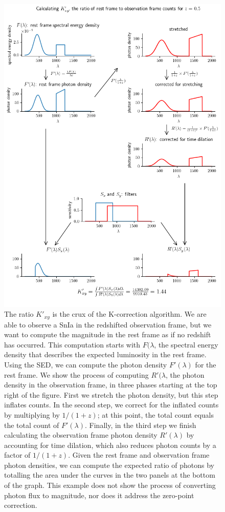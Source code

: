 \documentclass[linenumbers]{aastex631}
\begin{document}
\begin{figure}
  \includegraphics[width=.75\linewidth, height=0.75\vsize]{k_equation_flow.png}
  \caption{The ratio $K'_{xy}$ is the crux of the K-correction algorithm. We
  are able to observe a SnIa in the redshifted observation frame, but we want
  to compute the magnitude in the rest frame as if no redshift has occurred.
  This computation starts with $F(\lambda$, the spectral energy density that
  describes the expected luminosity in the rest frame. Using the SED, we can
  compute the photon density $F'(\lambda)$ for the rest frame. We show the
  process of computing $R'(\lambda$, the photon density in the observation
  frame, in three phases starting at the top right of the figure. First we
  stretch the photon density, but this step inflates counts. In the second
  step, we correct for the inflated counts by multiplying by $1/(1+z)$;
  at this point, the total count equals the total count of $F'(\lambda)$.
  Finally, in the third step we finish calculating the observation frame photon
  density $R'(\lambda)$ by accounting for time dilation, which also reduces
  photon counts by a factor of $1/(1+z)$.  Given the rest frame and
  observation frame photon densities, we can compute the expected ratio of
  photons by totalling the area under the curves in the two panels at the
  bottom of the graph. This example does not show the process of converting
  photon flux to magnitude, nor does it address the zero-point correction.
  }
  \label{fig:k-example}
\end{figure}
\end{document}
